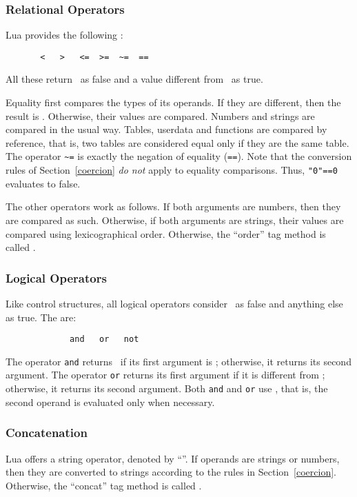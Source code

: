 \subsubsection{Relational Operators}
Lua provides the following :
\begin{verbatim}
       <   >   <=  >=  ~=  ==
\end{verbatim}
All these return \nil\ as false and a value different from \nil\ as true.

Equality first compares the types of its operands.
If they are different, then the result is \nil.
Otherwise, their values are compared.
Numbers and strings are compared in the usual way.
Tables, userdata and functions are compared by reference,
that is, two tables are considered equal only if they are the same table.
The operator \verb|~=| is exactly the negation of equality (\verb|==|).
Note that the conversion rules of Section~\ref{coercion}
\emph{do not} apply to equality comparisons.
Thus, \verb|"0"==0| evaluates to false.

The other operators work as follows.
If both arguments are numbers, then they are compared as such.
Otherwise, if both arguments are strings,
their values are compared using lexicographical order.
Otherwise, the ``order'' tag method is called .

\subsubsection{Logical Operators}
Like control structures, all logical operators
consider \nil\ as false and anything else as true.
The  are:
\begin{verbatim}
             and   or   not
\end{verbatim}
The operator \verb|and| returns \nil\ if its first argument is \nil;
otherwise, it returns its second argument.
The operator \verb|or| returns its first argument
if it is different from \nil;
otherwise, it returns its second argument.
Both \verb|and| and \verb|or| use ,
that is,
the second operand is evaluated only when necessary.

\subsubsection{Concatenation}
Lua offers a string  operator,
denoted by ``''.
If operands are strings or numbers, then they are converted to
strings according to the rules in Section~\ref{coercion}.
Otherwise, the ``concat'' tag method is called .

